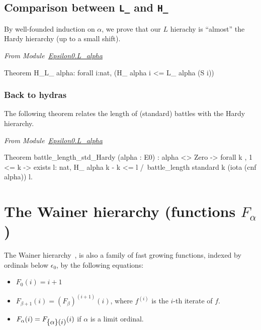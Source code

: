 \documentclass[a4paper]{book}
\begin{document}
\subsection{Comparison between \texttt{L\_} and \texttt{H\_} }

By well-founded induction on $\alpha$, we prove that our $L$ hierachy is ``almost'' the Hardy hierarchy (up to a small shift).

\emph{From Module~\href{../src/html/hydras.Epsilon0.L_alpha.html\#H_L_}{Epsilon0.L\_alpha}}

\begin{Coqsrc}
 Theorem H_L_ alpha: forall i:nat,  (H_ alpha i <= L_ alpha (S i))%
\end{Coqsrc}
 
\subsubsection{Back to hydras}

The following theorem relates the length of (standard) battles with the Hardy hierarchy.

\emph{From Module~\href{../src/html/hydras.Epsilon0.L_alpha.html}{Epsilon0.L\_alpha}}

\begin{Coqsrc}
Theorem battle_length_std_Hardy (alpha : E0) :
  alpha <> Zero ->
  forall k , 1 <= k -> exists l: nat,  
       H_ alpha k - k <= l /\
       battle_length standard k (iota (cnf alpha)) l.    
\end{Coqsrc}



\section{The Wainer hierarchy (functions \texorpdfstring{$F_\alpha$}{F\_alpha})}
\label{sect:wainer}


The Wainer hierarchy~\cite{BW85, Wainer1970, KS81}, is also a family of fast growing functions, indexed by ordinals below $\epsilon_0$, by the following equations:

\label{F_equations}
\begin{itemize}
\item $F_0(i)=i+1$
\item $F_{\beta+1}(i)= (F_\beta)^{(i+1)}(i)$, where $f^{(i)}$ is the $i$-th iterate of $f$.
\item $F_\alpha(i) = F_{\mbox{$\{\alpha\}(i)$}} (i)$ if $\alpha$ is a limit ordinal.
\end{itemize}
\end{document}

